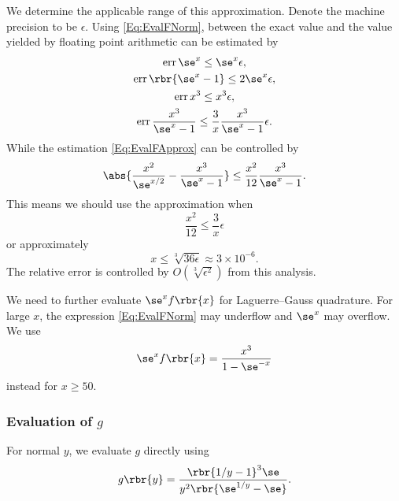 \documentclass[english, nochinese]{pnote}
\DeclareMathOperator{\operr}{\mathrm{err}}
\begin{document}
We determine the applicable range of this approximation. Denote the machine precision to be $\epsilon$. Using \eqref{Eq:EvalFNorm}, between the exact value and the value yielded by floating point arithmetic can be estimated by
\begin{gather}
\operr \se^x \le \se^x \epsilon, \\
\operr \rbr{ \se^x - 1 } \le 2 \se^x \epsilon, \\
\operr x^3 \le x^3 \epsilon, \\
\operr \frac{x^3}{ \se^x - 1 } \le \frac{3}{x} \frac{x^3}{ \se^x - 1 } \epsilon.
\end{gather}
While the estimation \eqref{Eq:EvalFApprox} can be controlled by
\begin{equation}
\abs{ \frac{x^2}{\se^{ x / 2 }} - \frac{x^3}{ \se^x - 1 } } \le \frac{x^2}{12} \frac{x^3}{ \se^x - 1 }.
\end{equation}
This means we should use the approximation when
\begin{equation}
\frac{x^2}{12} \le \frac{3}{x} \epsilon
\end{equation}
or approximately
\begin{equation}
x \le \sqrt[3]{ 36 \epsilon } \approx 3 \times 10^{-6}.
\end{equation}
The relative error is controlled by $ O (\sqrt[3]{\epsilon^2}) $ from this analysis.

We need to further evaluate $ \se^x f \rbr{x} $ for Laguerre--Gauss quadrature. For large $x$, the expression \eqref{Eq:EvalFNorm} may underflow and $\se^x$ may overflow. We use
\begin{equation}
\se^x f \rbr{x} = \frac{x^3}{ 1 - \se^{-x} }
\end{equation}
instead for $ x \ge 50 $.

\subsubsection{Evaluation of $g$}

For normal $y$, we evaluate $g$ directly using
\begin{equation} \label{Eq:EvalGNorm}
g \rbr{y} = \frac{ \rbr{ 1 / y - 1 }^3 \se }{ y^2 \rbr{ \se^{ 1 / y } - \se } }.
\end{equation}
\end{document}
